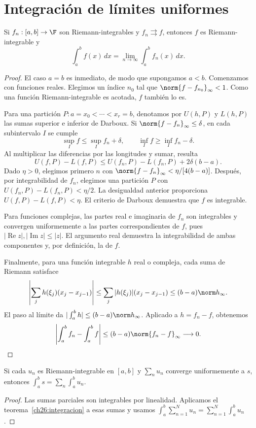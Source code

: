 \section{Integración de límites uniformes}
\begin{teorema}\label{ch26:integracion}
Si $f_n:[a,b]\to\F$ son Riemann-integrables y $f_n\rightrightarrows f$, entonces $f$ es Riemann-integrable y
\[
 \int_a^bf(x)\,dx=\lim_{n\to\infty}\int_a^bf_n(x)\,dx.
\]
\end{teorema}
\begin{proof}
El caso $a=b$ es inmediato, de modo que supongamos $a<b$. Comenzamos con funciones reales. Elegimos un índice $n_0$ tal que $\norm{f-f_{n_0}}_\infty<1$. Como una función Riemann-integrable es acotada, $f$ también lo es.

Para una partición $P:a=x_0<\cdots<x_r=b$, denotamos por $U(h,P)$ y $L(h,P)$ las sumas superior e inferior de Darboux. Si $\norm{f-f_n}_\infty\le\delta$, en cada subintervalo $I$ se cumple
\[
 \sup_I f\le\sup_I f_n+\delta,
 \qquad \inf_I f\ge\inf_I f_n-\delta.
\]
Al multiplicar las diferencias por las longitudes y sumar, resulta
\[
 U(f,P)-L(f,P)\le U(f_n,P)-L(f_n,P)+2\delta(b-a).
\]
Dado $\eta>0$, elegimos primero $n$ con $\norm{f-f_n}_\infty<\eta/[4(b-a)]$. Después, por integrabilidad de $f_n$, elegimos una partición $P$ con $U(f_n,P)-L(f_n,P)<\eta/2$. La desigualdad anterior proporciona $U(f,P)-L(f,P)<\eta$. El criterio de Darboux demuestra que $f$ es integrable.

Para funciones complejas, las partes real e imaginaria de $f_n$ son integrables y convergen uniformemente a las partes correspondientes de $f$, pues $|\operatorname{Re}z|,|\operatorname{Im}z|\le|z|$. El argumento real demuestra la integrabilidad de ambas componentes y, por definición, la de $f$.

Finalmente, para una función integrable $h$ real o compleja, cada suma de Riemann satisface
\[
 \left|\sum_j h(\xi_j)(x_j-x_{j-1})\right|
 \le\sum_j|h(\xi_j)|(x_j-x_{j-1})
 \le(b-a)\norm h_\infty.
\]
El paso al límite da $|\int_a^b h|\le(b-a)\norm h_\infty$. Aplicado a $h=f_n-f$, obtenemos
\[
 \left|\int_a^bf_n-\int_a^bf\right|
 \le(b-a)\norm{f_n-f}_\infty\longrightarrow0.
\]
\end{proof}

\begin{corolario}
Si cada $u_n$ es Riemann-integrable en $[a,b]$ y $\sum_nu_n$ converge uniformemente a $s$, entonces
$\int_a^bs=\sum_n\int_a^bu_n$.
\end{corolario}
\begin{proof}
Las sumas parciales son integrables por linealidad. Aplicamos el teorema~\ref{ch26:integracion} a esas sumas y usamos $\int_a^b\sum_{n=1}^Nu_n=\sum_{n=1}^N\int_a^bu_n$.
\end{proof}

